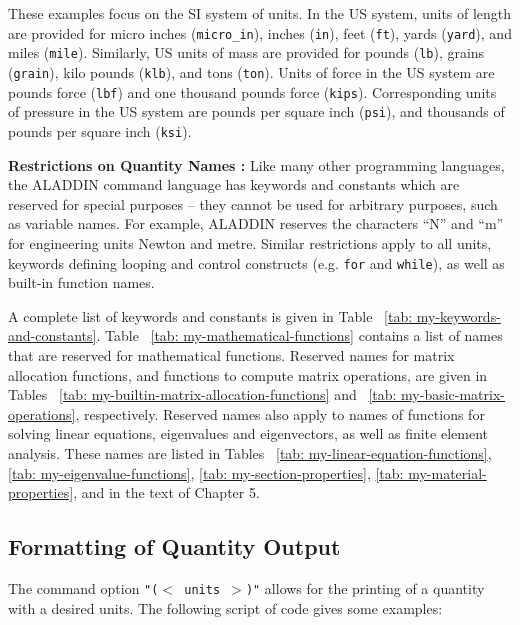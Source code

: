 \vspace{0.25 in}\noindent
These examples focus on the SI system of units.
In the US system, units of length are provided for
micro inches ({\tt micro\_in}), inches ({\tt in}),
feet ({\tt ft}), yards ({\tt yard}), and miles ({\tt mile}).
Similarly, US units of mass are provided for
pounds ({\tt lb}), grains ({\tt grain}),
kilo pounds ({\tt klb}), and tons ({\tt ton}).
Units of force in the US system are pounds force
({\tt lbf}) and one thousand pounds force ({\tt kips}).
Corresponding units of pressure in the US system are
pounds per square inch ({\tt psi}),
and thousands of pounds per square inch ({\tt ksi}).

\vspace{0.25 in}\noindent
{\bf Restrictions on Quantity Names :}
Like many other programming languages,
the ALADDIN command language has keywords and constants
which are reserved for special purposes -- they 
cannot be used for arbitrary purposes, such as variable names.
For example, ALADDIN reserves the characters ``N'' and ``m'' 
for engineering units Newton and metre.
Similar restrictions apply to all units,
keywords defining looping and control constructs (e.g. {\tt for} and {\tt while}),
as well as built-in function names.

\vspace{0.15 in}
\noindent\hspace{0.50 in}
A complete list of keywords and constants is given
in Table ~\ref{tab: my-keywords-and-constants}.
Table ~\ref{tab: my-mathematical-functions} contains a list
of names that are reserved for mathematical functions.
Reserved names for matrix allocation functions,
and functions to compute matrix operations,
are given in Tables ~\ref{tab: my-builtin-matrix-allocation-functions}
and ~\ref{tab: my-basic-matrix-operations}, respectively.
Reserved names also apply to names of functions for solving
linear equations, eigenvalues and eigenvectors, as well as 
finite element analysis. These names are listed in
Tables ~\ref{tab: my-linear-equation-functions}, \ref{tab: my-eigenvalue-functions},
\ref{tab: my-section-properties}, \ref{tab: my-material-properties},
and in the text of Chapter 5.

\subsection{Formatting of Quantity Output}

\vspace{0.15 in}
\noindent\hspace{0.5 in}
The command option {\tt "($<$ units $>$)"} allows for the
printing of a quantity with a desired units.
The following script of code gives some examples:

